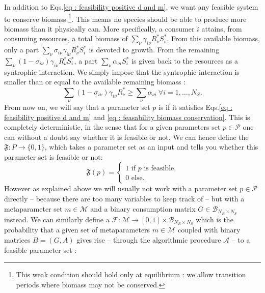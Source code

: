 \documentclass[12pt, titlepage]{report}
\begin{document}
In addition to Eqs.\eqref{eq : feasibility positive d and m}, we want any feasible system to conserve biomass \footnote{This weak condition should hold only at equilibrium : we allow transition periods where biomass may not be conserved.}. This means no species should be able to produce more biomass than it physically can. More specifically, a consumer $i$ attains, from consuming resources, a total biomass of $\sum_\nu \gamma_{i\nu}R^*_\nu S^*_i$.
From this available biomass, only a part $\sum_\nu \sigma_{i\nu}\gamma_{i\nu}R^*_\nu S^*_i$ is devoted to growth. From the remaining $\sum_\nu (1-\sigma_{i\nu})\gamma_{i\nu}R^*_\nu S^*_i$, a part $\sum_\nu \alpha_{\nu i} S^*_i$ is given back to the resources as a syntrophic interaction. We simply impose that the syntrophic interaction is smaller than or equal to the available remaining biomass :
\begin{equation}\label{eq : feasability biomass conservation}
 \sum_\nu (1-\sigma_{i\nu})\gamma_{i\nu}R^*_\nu  \geq \sum_\nu \alpha_{\nu i} \ \forall i=1, \dots, N_S.
\end{equation}
From now on, we will say that a parameter set $p$ is  if it satisfies Eqs.\eqref{eq : feasibility positive d and m} and \eqref{eq : feasability biomass conservation}.
This is completely deterministic, in the sense that for a given parameters set $p \in \mathcal{P}$ one can without a doubt say whether it is feasible or not.
We can hence define the  $\mathfrak{F} : P \rightarrow \{ 0, 1 \}$, which takes a parameter set as an input and tells you whether this parameter set is feasible or not:
\begin{equation}
\mathfrak{F}(p)=
\begin{cases}
1 \text{ if }p \text{ is feasible,} \\
0 \text{ else.}
\end{cases}
\end{equation}
However as explained above we will usually not work with a parameter set $p \in \mathcal{P}$ directly -- because there are too many variables to keep track of -- but with a metaparameter set $m \in \mathcal{M}$ and a binary consumption matrix $G \in \mathcal{B}_{N_R \times N_S}$ instead. We can similarly define a
 $\mathcal{F} : \mathcal{M} \rightarrow [0, 1] \times \mathcal{B}_{N_R \times N_S}$ which is the probability that a given set of metaparameters $m \in \mathcal{M}$ coupled with binary matrices $B=(G, A)$ gives rise -- through the algorithmic procedure $\mathcal{A}$ -- to a feasible parameter set :
\end{document}
